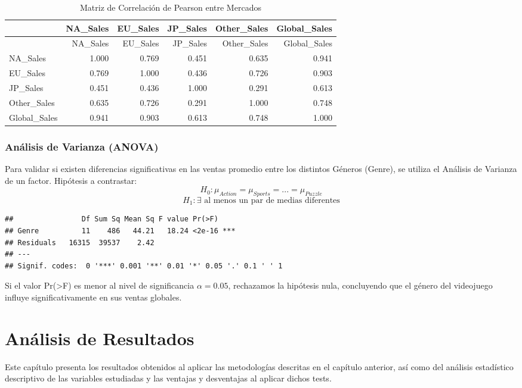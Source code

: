\documentclass[oneside,11pt]{Latex/Classes/PhDthesisPSnPDF}
\begin{document}
\begin{longtable}[]{@{}lrrrrr@{}}
\caption{Matriz de Correlación de Pearson entre Mercados}\tabularnewline
\toprule\noalign{}
& NA\_Sales & EU\_Sales & JP\_Sales & Other\_Sales & Global\_Sales \\
\midrule\noalign{}
\endfirsthead
\toprule\noalign{}
& NA\_Sales & EU\_Sales & JP\_Sales & Other\_Sales & Global\_Sales \\
\midrule\noalign{}
\endhead
\bottomrule\noalign{}
\endlastfoot
NA\_Sales & 1.000 & 0.769 & 0.451 & 0.635 & 0.941 \\
EU\_Sales & 0.769 & 1.000 & 0.436 & 0.726 & 0.903 \\
JP\_Sales & 0.451 & 0.436 & 1.000 & 0.291 & 0.613 \\
Other\_Sales & 0.635 & 0.726 & 0.291 & 1.000 & 0.748 \\
Global\_Sales & 0.941 & 0.903 & 0.613 & 0.748 & 1.000 \\
\end{longtable}

\subsection{Análisis de Varianza (ANOVA)}

Para validar si existen diferencias significativas en las ventas
promedio entre los distintos Géneros (Genre), se utiliza el Análisis de
Varianza de un factor. Hipótesis a contrastar:
\[ H_0: \mu_{Action} = \mu_{Sports} = ... = \mu_{Puzzle} \]
\[ H_1: \exists \text{ al menos un par de medias diferentes} \]

\begin{verbatim}
##                Df Sum Sq Mean Sq F value Pr(>F)    
## Genre          11    486   44.21   18.24 <2e-16 ***
## Residuals   16315  39537    2.42                   
## ---
## Signif. codes:  0 '***' 0.001 '**' 0.01 '*' 0.05 '.' 0.1 ' ' 1
\end{verbatim}

Si el valor Pr(\textgreater F) es menor al nivel de significancia
\(\alpha = 0.05\), rechazamos la hipótesis nula, concluyendo que el
género del videojuego influye significativamente en sus ventas globales.

\chapter{Análisis de Resultados}

\small Este capítulo presenta los resultados obtenidos al aplicar las
metodologías descritas en el capítulo anterior, así como del análisis
estadístico descriptivo de las variables estudiadas y las ventajas y
desventajas al aplicar dichos tests.
\end{document}
